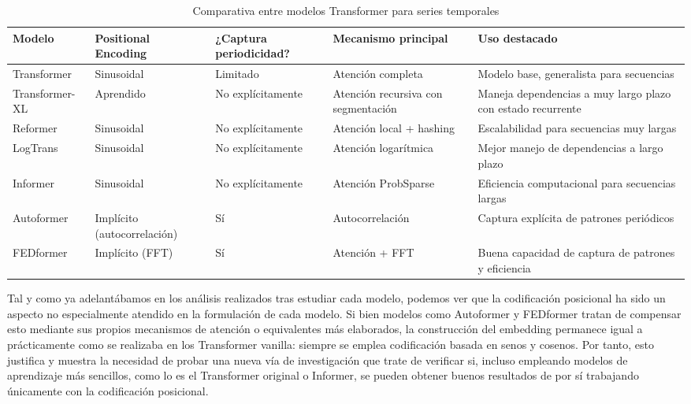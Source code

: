 {\begin{table}[!ht]
    \centering
    \begingroup
    \renewcommand{\arraystretch}{1.15}
    \begin{tabular}{P{2.25cm} | P{2cm} P{2cm} P{3cm} P{3.2cm}}
        \toprule
        \textbf{Modelo} & \textbf{Positional Encoding} & \textbf{¿Captura periodicidad?} & \textbf{Mecanismo principal} & \textbf{Uso destacado} \\
        \midrule
        Transformer     & Sinusoidal       & Limitado                        & Atención completa                   & Modelo base, generalista para secuencias                    \\
        Transformer-XL  & Aprendido           & No explícitamente               & Atención recursiva con segmentación & Maneja dependencias a muy largo plazo con estado recurrente \\
        Reformer        & Sinusoidal                   & No explícitamente               & Atención local + hashing            & Escalabilidad para secuencias muy largas                    \\
        LogTrans        & Sinusoidal                   & No explícitamente               & Atención logarítmica                & Mejor manejo de dependencias a largo plazo                  \\
        Informer        & Sinusoidal                   & No explícitamente               & Atención ProbSparse                 & Eficiencia computacional para secuencias largas             \\
        Autoformer      & Implícito (autocorrelación)  & Sí                              & Autocorrelación                     & Captura explícita de patrones periódicos                    \\
        FEDformer       & Implícito (FFT)              & Sí                              & Atención + FFT                      & Buena capacidad de captura de patrones y eficiencia         \\
        \bottomrule
    \end{tabular}
    \caption{Comparativa entre modelos Transformer para series temporales}
    \label{resumenmodelos}
    \endgroup
\end{table}

Tal y como ya adelantábamos en los análisis realizados tras estudiar cada modelo, podemos ver que la codificación posicional ha sido un aspecto no especialmente atendido en la formulación de cada modelo. Si bien modelos como Autoformer y FEDformer tratan de compensar esto mediante sus propios mecanismos de atención o equivalentes más elaborados, la construcción del embedding permanece igual a prácticamente como se realizaba en los Transformer vanilla: siempre se emplea codificación basada en senos y cosenos. Por tanto, esto justifica y muestra la necesidad de probar una nueva vía de investigación que trate de verificar si, incluso empleando modelos de aprendizaje más sencillos, como lo es el Transformer original o Informer, se pueden obtener buenos resultados de por sí trabajando únicamente con la codificación posicional.\\

}
